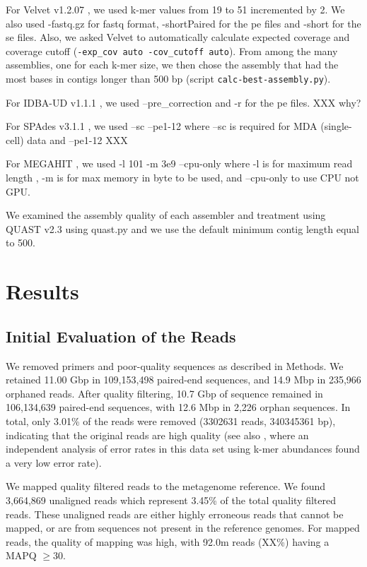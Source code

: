 For Velvet v1.2.07  \cite{ velvet}, we used k-mer values from 19 to 51
incremented by 2. We also used -fastq.gz for fastq format,
-shortPaired for the pe files and -short for the se files. Also, we
asked Velvet to automatically calculate expected coverage and coverage
cutoff ({\tt -exp\_cov auto -cov\_cutoff auto}).
From among the many assemblies, one for each k-mer size,
we then chose the assembly that had the most bases in contigs longer than
500 bp (script {\tt calc-best-assembly.py}).

For IDBA-UD v1.1.1 \cite{idba},  we used  --pre\_correction and -r for the pe files. XXX why?

For SPAdes v3.1.1 \cite{spades}, we used --sc --pe1-12   where --sc is required for MDA (single-cell) data  and --pe1-12 XXX

For MEGAHIT \cite{megahit}, we used -l 101 -m 3e9 --cpu-only where -l is for maximum read length , -m is for max memory in byte to be used, and --cpu-only to use CPU not GPU.


We examined the assembly quality of each assembler and treatment using
QUAST v2.3 \cite{quast} using quast.py and we use the default minimum
contig length equal to 500.


\section*{Results}

\subsection*{Initial Evaluation of the Reads}

We removed primers and poor-quality sequences as described in Methods.
We retained 11.00 Gbp in 109,153,498 paired-end sequences, and 14.9
Mbp in 235,966 orphaned reads.  After quality filtering, 10.7 Gbp of
sequence remained in 106,134,639 paired-end sequences, with 12.6 Mbp
in 2,226 orphan sequences.  In total, only 3.01\% of the reads were
removed (3302631 reads, 340345361 bp), indicating that the original
reads are high quality (see also \cite{streaming}, where an
independent analysis of error rates in this data set using k-mer
abundances found a very low error rate).

We mapped quality filtered reads to the metagenome reference. 
We found 3,664,869 unaligned reads which represent 3.45\% of the
total quality filtered reads.  These unaligned reads are either highly
erroneous reads that cannot be mapped, or are from sequences not
present in the reference genomes.  For mapped reads, the quality of
mapping was high, with 92.0m reads (XX\%) having a MAPQ $\geq 30$.

